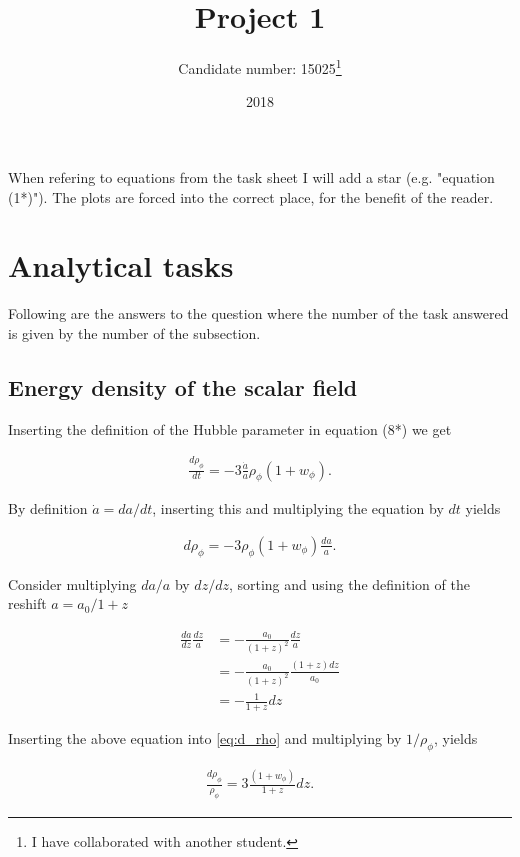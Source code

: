 \documentclass[a4paper,10pt]{article}
\title{Project 1}
\author{Candidate number: 15025\footnote{I have collaborated with another student.}}
\date{2018}
\begin{document}
\maketitle

When refering to equations from the task sheet I will add a star (e.g. "equation (1*)"). The plots are forced into the correct place, for the benefit of the reader.

\section{Analytical tasks}
Following are the answers to the question where the number of the task answered is given by the number of the subsection.

\subsection{Energy density of the scalar field}
Inserting the definition of the Hubble parameter in equation (8*) we get 

\begin{align}
\frac{d\rho_{\phi}}{dt} = -3\frac{\dot{a}}{a}\rho_{\phi}(1+w_{\phi}).
\end{align}

By definition $\dot{a} = da/dt$, inserting this and multiplying the equation by $dt$ yields

\begin{align}\label{eq:d_rho}
d\rho_{\phi} = -3\rho_{\phi}(1+w_{\phi})\frac{da}{a}.
\end{align}

Consider multiplying $da/a$ by $dz/dz$, sorting and using the definition of the reshift $a = a_0/1+z$

\begin{equation}
\begin{split}
\frac{da}{dz}\frac{dz}{a} &= -\frac{a_0}{(1+z)^2}\frac{dz}{a}  \\
&= -\frac{a_0}{(1+z)^2} \frac{(1+z) dz}{a_0} \\
&= -\frac{1}{1+z} dz
\end{split}
\end{equation}

Inserting the above equation into \eqref{eq:d_rho} and multiplying by $1/ \rho_{\phi}$, yields

\begin{align}
\frac{d\rho_{\phi}}{\rho_{\phi}} = 3\frac{(1+w_{\phi})}{1+z} dz.
\end{align}
\end{document}
